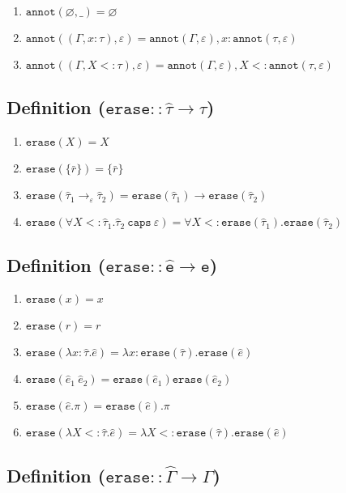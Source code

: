 \documentclass{llncs}
\newcommand{\keywadj}[1]{\mathtt{#1}}
\newcommand{\keyw}[1]{\keywadj{#1}~}
\newcommand{\kw}[1]{\keyw{ #1 }}
\newcommand{\kwa}[1]{\keywadj{ #1 }}
\newcommand{\annot}[2]{
	\keywadj{annot}(#1, #2)
}
\newcommand{\erase}[1]{
	\keywadj{erase}(#1)
}
\newcommand{\poly}[2]{
	\forall #1. #2
}
\newcommand{\polycap}[3]{
	\forall #1. #2~ \kw{caps} #3
}
\begin{document}
\begin{enumerate}
	\item $\kwa{annot}(\varnothing, \_) = \varnothing$
	\item $\kwa{annot}((\Gamma, x: \tau), \varepsilon) = \kwa{annot}(\Gamma, \varepsilon), x: \kwa{annot}(\tau, \varepsilon)$
	\item $\kwa{annot}((\Gamma, X <: \tau), \varepsilon) = \kwa{annot}(\Gamma, \varepsilon), X <: \annot{\tau}{\varepsilon}$
\end{enumerate}

\subsection*{Definition ($\kwa{erase :: \hat \tau \rightarrow \tau}$)}

\begin{enumerate}
	\item $\erase{X} = X$
	\item $\erase{\{ \bar r \}} = \{ \bar r \}$
	\item $\kwa{erase}(\hat \tau_1 \rightarrow_{\varepsilon} \hat \tau_2) = \kwa{erase}(\hat \tau_1) \rightarrow \kwa{erase}(\hat \tau_2)$
	\item $\erase{\polycap{X <: \hat \tau_1}{\hat \tau_2}{\varepsilon}} = \poly{X <: \erase{\hat \tau_1}}{\erase{\hat \tau_2}}$
\end{enumerate}

\subsection*{Definition ($\kwa{erase :: \hat e \rightarrow e}$)}

\begin{enumerate}
	\item $\kwa{erase}(x) = x$
	\item $\kwa{erase}(r) = r$
	\item $\kwa{erase}(\lambda x: \hat \tau.\hat e) = \lambda x: \kwa{erase}(\hat \tau).\kwa{erase}(\hat e)$
	\item $\kwa{erase}(\hat e_1~\hat e_2) = \kwa{erase}(\hat e_1) \kwa{erase}(\hat e_2)$
	\item $\kwa{erase}(\hat e.\pi) = \kwa{erase}(\hat e).\pi$
	\item $\erase{\lambda X <: \hat \tau. \hat e} = \lambda X <: \erase{\hat \tau}. \erase{\hat e}$
\end{enumerate}


\subsection*{Definition ($\kwa{erase :: \hat \Gamma \rightarrow \Gamma}$)}
\end{document}
